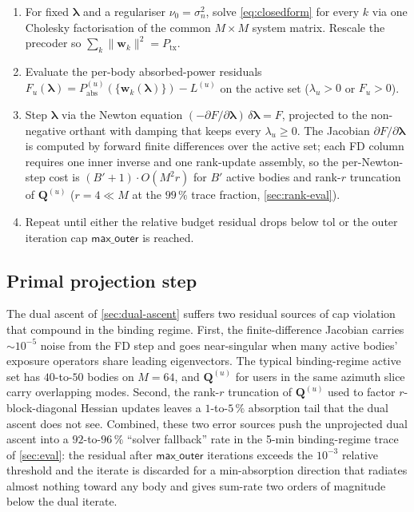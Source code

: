 \documentclass[journal,twocolumn,10pt]{IEEEtran}
\theoremstyle{plain}
\theoremstyle{remark}
\newcommand{\ww}{\mathbf{w}}
\newcommand{\Pabs}{P_{\mathrm{abs}}}
\newcommand{\Qmat}{\mathbf{Q}}
\begin{document}
\begin{enumerate}
\item For fixed $\bm\lambda$ and a regulariser $\nu_0 = \sigma_n^2$,
  solve \cref{eq:closedform} for every $k$ via one Cholesky
  factorisation of the common $M\times M$ system matrix. Rescale
  the precoder so $\sum_k \|\ww_k\|^2 = P_{\mathrm{tx}}$.
\item Evaluate the per-body absorbed-power residuals
  $F_u(\bm\lambda) = \Pabs^{(u)}(\{\ww_k(\bm\lambda)\}) - L^{(u)}$
  on the active set ($\lambda_u > 0$ or $F_u > 0$).
\item Step $\bm\lambda$ via the Newton equation
  $(-\partial F/\partial \bm\lambda)\,\delta\bm\lambda = F$,
  projected to the non-negative orthant with damping that keeps every
  $\lambda_u \geq 0$. The Jacobian $\partial F/\partial \bm\lambda$
  is computed by forward finite differences over the active set;
  each FD column requires one inner inverse and one rank-update
  assembly, so the per-Newton-step cost is $(B' + 1) \cdot O(M^2 r)$
  for $B'$ active bodies and rank-$r$ truncation of $\Qmat^{(u)}$
  ($r = 4 \ll M$ at the $99\,\%$ trace fraction, \cref{sec:rank-eval}).
\item Repeat until either the relative budget residual drops below
  $\mathrm{tol}$ or the outer iteration cap $\textsf{max\_outer}$ is
  reached.
\end{enumerate}

\subsection{Primal projection step}\label{sec:primal-projection}

The dual ascent of \cref{sec:dual-ascent} suffers two residual
sources of cap violation that compound in the binding regime.
First, the finite-difference Jacobian carries $\sim 10^{-5}$ noise
from the FD step and goes near-singular when many active bodies'
exposure operators share leading eigenvectors. The typical
binding-regime active set has $40$-to-$50$ bodies on $M = 64$, and
$\Qmat^{(u)}$ for users in the same azimuth slice carry overlapping
modes. Second, the rank-$r$ truncation of $\Qmat^{(u)}$ used to
factor $r$-block-diagonal Hessian updates leaves a $1$-to-$5\,\%$
absorption tail that the dual ascent does not see. Combined, these
two error sources push the unprojected dual ascent into a
$92$-to-$96\,\%$ ``solver fallback'' rate in the 5-min binding-regime
trace of \cref{sec:eval}: the residual after $\textsf{max\_outer}$
iterations exceeds the $10^{-3}$ relative threshold and the iterate
is discarded for a min-absorption direction that radiates almost
nothing toward any body and gives sum-rate two orders of magnitude
below the dual iterate.
\end{document}
